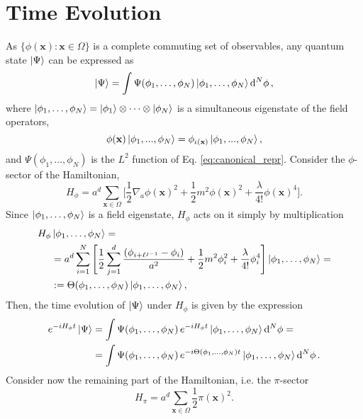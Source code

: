 \documentclass[a4paper,10pt]{report}
\begin{document}
\section{Time Evolution}
As $\{\phi(\mathbf{x}):\mathbf{x}\in\Omega\}$ is a complete commuting set of observables, any quantum state $\ket{\Psi}$ can be expressed as
\begin{equation}
\ket{\Psi} = \int\Psi(\phi_1,\dots,\phi_N)\ket{\phi_1,\dots,\phi_N}\dd[N]{\phi},
\end{equation}
where $\ket{\phi_1,\dots,\phi_N} = \ket{\phi_1}\otimes\dots\otimes\ket{\phi_N}$ is a simultaneous eigenstate of the field operators,
\begin{equation}
\phi(\mathbf{x})\ket{\phi_1,...,\phi_N} = \phi_{\iota(\mathbf{x})}\ket{\phi_1,...,\phi_N},
\end{equation}
and $\Psi(\phi_1,\dots,\phi_N)$ is the $L^2$ function of Eq. \eqref{eq:canonical_repr}. 
Consider the $\phi$-sector of the Hamiltonian,
\begin{equation}
H_\phi = a^d\sum_{\mathbf{x}\in\Omega}\bigg[\frac{1}{2}\nabla_a\phi(\mathbf{x})^2 + \frac{1}{2}m^2\phi(\mathbf{x})^2 + \frac{\lambda}{4!}\phi(\mathbf{x})^4\bigg].
\end{equation}
Since $\ket{\phi_1,\dots,\phi_N}$ is a field eigenstate,  $H_\phi$ acts on it simply by multiplication
\begin{align}
H_\phi&\ket{\phi_1,\dots,\phi_N} = \nonumber\\
&=a^d\sum_{i=1}^N\Bigg[\frac{1}{2}\sum_{j=1}^d\frac{(\phi_{i+\ell^{j-1}}-\phi_i)}{a^2} + \frac{1}{2}m^2\phi_i^2 + \frac{\lambda}{4!}\phi_i^4\Bigg]\ket{\phi_1,\dots,\phi_N} = \nonumber\\
&:=\Theta(\phi_1,\dots,\phi_N)\ket{\phi_1,\dots,\phi_N},
\label{eq:Theta-phase_def}
\end{align}
Then, the time evolution of $\ket{\Psi}$ under $H_\phi$ is given by the expression
\begin{align}
e^{-iH_\phi t}\ket{\Psi} &= \int\Psi(\phi_1,\dots,\phi_N)\,e^{-iH_\phi t}\ket{\phi_1,\dots,\phi_N}\dd[N]{\phi} = \nonumber\\
&=\int\Psi(\phi_1,\dots,\phi_N)\,e^{-i\Theta(\phi_1,\dots,\phi_N)t}\ket{\phi_1,\dots,\phi_N}\dd[N]{\phi}.
\label{eq:phi_evolution}
\end{align}
Consider now the remaining part of the Hamiltonian, i.e. the $\pi$-sector
\begin{equation}
H_\pi = a^d\sum_{\mathbf{x}\in\Omega}\frac{1}{2}\pi(\mathbf{x})^2.
\end{equation}
\end{document}
